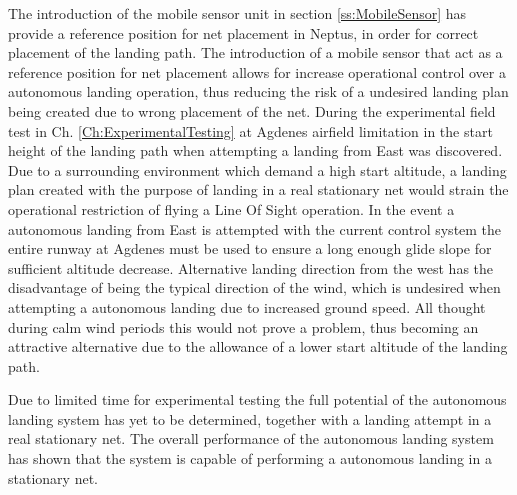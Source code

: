 The introduction of the mobile sensor unit in section \ref{ss:MobileSensor} has provide a reference position for net placement in Neptus, in order for correct placement of the landing path. The introduction of a mobile sensor that act as a reference position for net placement allows for increase operational control over a autonomous landing operation, thus reducing the risk of a undesired landing plan being created due to wrong placement of the net.
During the experimental field test in Ch. \ref{Ch:ExperimentalTesting} at Agdenes airfield limitation in the start height of the landing path when attempting a landing from East was discovered. Due to a surrounding environment which demand a high start altitude, a landing plan created with the purpose of landing in a real stationary net would strain the operational restriction of flying a Line Of Sight operation. In the event a autonomous landing from East is attempted with the current control system the entire runway at Agdenes must be used to ensure a long enough glide slope for sufficient altitude decrease. Alternative landing direction from the west has the disadvantage of being the typical direction of the wind, which is undesired when attempting a autonomous landing due to increased ground speed. All thought during calm wind periods this would not prove a problem, thus becoming an attractive alternative due to the allowance of a lower start altitude of the landing path.

Due to limited time for experimental testing the full potential of the autonomous landing system has yet to be determined, together with a landing attempt in a real stationary net. The overall performance of the autonomous landing system has shown that the system is capable of performing a autonomous landing in a stationary net.


